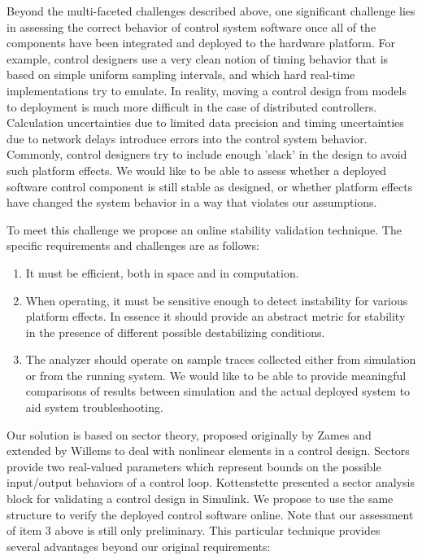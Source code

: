 Beyond the multi-faceted challenges described above, one significant challenge lies in 
assessing the correct behavior of control system software once all of the components have
been integrated and deployed to the hardware platform.  For example, control designers use a very 
clean notion of timing behavior that is based on simple uniform sampling intervals, and which hard 
real-time implementations try to emulate. In reality, moving a control design from models to 
deployment is much more difficult in the case of distributed controllers.  Calculation uncertainties 
due to limited data precision and timing uncertainties due to network delays introduce errors into 
the control system behavior.  Commonly, control designers try to include enough 'slack' in the 
design to avoid such platform effects.  We would like to be able to assess whether a deployed 
software control component is still stable as designed, or whether platform effects have changed the 
system behavior in a way that violates our assumptions.

To meet this challenge we propose an online stability validation technique.  The specific
requirements and challenges are as follows:

\begin{enumerate}
 \item It must be efficient, both in space and in computation.  
 \item When operating, it must be sensitive enough to detect instability for various platform 
effects. In essence it should provide an abstract metric for stability in the presence of 
different possible destabilizing conditions.
 \item The analyzer should operate on sample traces collected either from simulation or from 
the running system. We would like to be able to provide meaningful comparisons of results between
simulation and the actual deployed system to aid system troubleshooting.
\end{enumerate}

Our solution is based on sector theory, proposed originally by Zames\cite{control:sectors1}
and extended by Willems\cite{control:sectorswillems} to deal with nonlinear elements in
a control design.  Sectors provide two real-valued parameters which represent bounds on the 
possible input/output behaviors of a control loop.  Kottenstette \cite{quad:passcontrol} presented a sector
analysis block for validating a control design in Simulink.  We propose to use the same
structure to verify the deployed control software online.  Note that our assessment of
item 3 above is still only preliminary.  This particular technique provides several advantages
beyond our original requirements:

